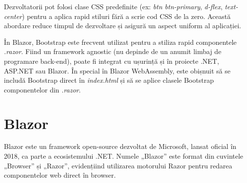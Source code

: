 Dezvoltatorii pot folosi clase CSS predefinite (ex: \textit{btn btn-primary}, \textit{d-flex}, \textit{text-center}) pentru a aplica
rapid stiluri fără a scrie cod CSS de la zero. Această abordare reduce timpul de dezvoltare și asigură un
aspect uniform al aplicației.\parencite{htmlcss}

În Blazor, Bootstrap este frecvent utilizat pentru a stiliza rapid componentele \textit{.razor}. Fiind un framework
agnostic (nu depinde de un anumit limbaj de programare back-end), poate fi integrat cu ușurință și în proiecte
.NET, ASP.NET sau Blazor. În special în Blazor WebAssembly, este obișnuit să se includă Bootstrap direct în
\textit{index.html} și să se aplice clasele Bootstrap componentelor din \textit{.razor}.

\section{Blazor}
Blazor este un framework open-source dezvoltat de Microsoft, lansat oficial în 2018, ca parte a ecosistemului .NET. Numele „Blazor” este format din cuvintele „Browser” și „Razor”, evidențiind utilizarea motorului Razor pentru redarea componentelor web direct în browser. \parencite{blazor}

